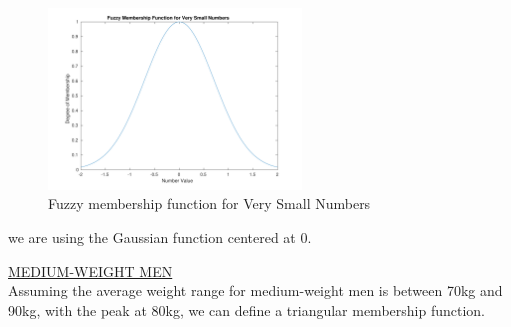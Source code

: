 \begin{figure}[H]
	\centering
	\includegraphics[width=0.6\textwidth]{../Problem 7/small_int.pdf}
	\caption{Fuzzy membership function for Very Small Numbers}	
\end{figure}
we are using the Gaussian function centered at 0.
\vspace{5mm}

\underline{MEDIUM-WEIGHT MEN}\\
Assuming the average weight range for medium-weight men is between 70kg and 90kg, with the peak at 80kg, we can define a triangular membership function.
